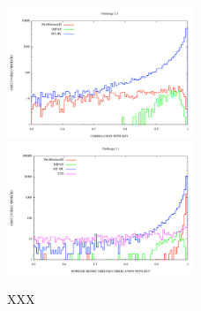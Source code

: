 \documentclass{iopart}
\begin{document}
\begin{figure}
\includegraphics[width=0.5\textwidth]{correlation}
\includegraphics[width=0.5\textwidth]{dcorrelation}
\caption{XXX\label{fig:correlation}}
\end{figure}
\end{document}
